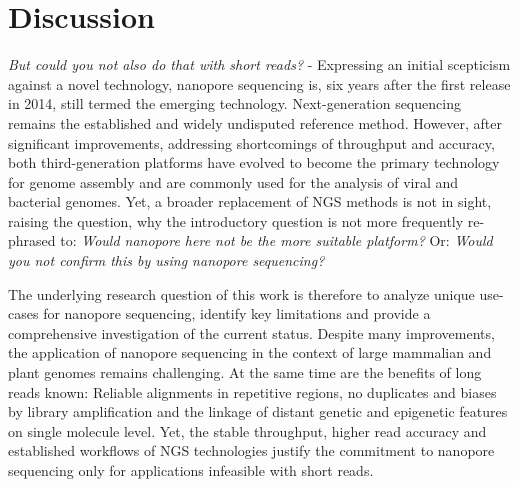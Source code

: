 \chapter{Discussion}
\label{cha:summary}

\textit{But could you not also do that with short reads?} - Expressing an initial scepticism against a novel technology, nanopore sequencing is, six years after the first release in 2014, still termed the emerging technology.
Next-generation sequencing remains the established and widely undisputed reference method.
However, after significant improvements, addressing shortcomings of throughput and accuracy, both third-generation platforms have evolved to become the primary technology for genome assembly and are commonly used for the analysis of viral and bacterial genomes.
Yet, a broader replacement of NGS methods is not in sight, raising the question, why the introductory question is not more frequently re-phrased to: \textit{Would nanopore here not be the more suitable platform?} Or: \textit{Would you not confirm this by using nanopore sequencing?}

The underlying research question of this work is therefore to analyze unique use-cases for nanopore sequencing, identify key limitations and provide a comprehensive investigation of the current status.
Despite many improvements, the application of nanopore sequencing in the context of large mammalian and plant genomes remains challenging.
At the same time are the benefits of long reads known: Reliable alignments in repetitive regions, no duplicates and biases by library amplification and the linkage of distant genetic and epigenetic features on single molecule level.
Yet, the stable throughput, higher read accuracy and established workflows of NGS technologies justify the commitment to nanopore sequencing only for applications infeasible with short reads.

